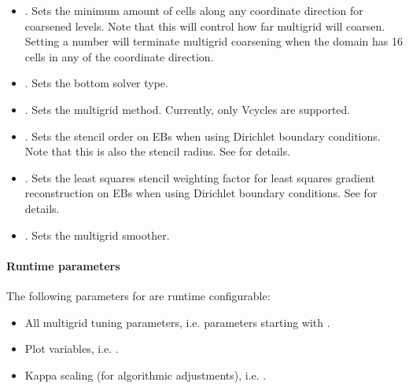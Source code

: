 \documentclass[letterpaper,10pt,english]{sphinxmanual}
\begin{document}
\begin{itemize}
\item {} 
.
Sets the minimum amount of cells along any coordinate direction for coarsened levels.
Note that this will control how far multigrid will coarsen. Setting a number  will terminate multigrid coarsening when the domain has 16 cells in any of the coordinate direction.

\item {} 
.
Sets the bottom solver type.

\item {} 
.
Sets the multigrid method.
Currently, only V\sphinxhyphen{}cycles are supported.

\item {} 
.
Sets the stencil order on EBs when using Dirichlet boundary conditions.
Note that this is also the stencil radius.
See {\hyperref[\detokenize{Source/LinearSolvers:chap-linearsolvers}]{}} for details.

\item {} 
.
Sets the least squares stencil weighting factor for least squares gradient reconstruction on EBs when using Dirichlet boundary conditions.
See {\hyperref[\detokenize{Utilities/LeastSquares:chap-leastsquares}]{}} for details.

\item {} 
.
Sets the multigrid smoother.

\end{itemize}


\paragraph{Runtime parameters}
\label{\detokenize{Solvers/RTE:runtime-parameters}}
The following parameters for  are run\sphinxhyphen{}time configurable:
\begin{itemize}
\item {} 
All multigrid tuning parameters, i.e. parameters starting with .

\item {} 
Plot variables, i.e. .

\item {} 
Kappa scaling (for algorithmic adjustments), i.e. .

\end{itemize}
\end{document}

